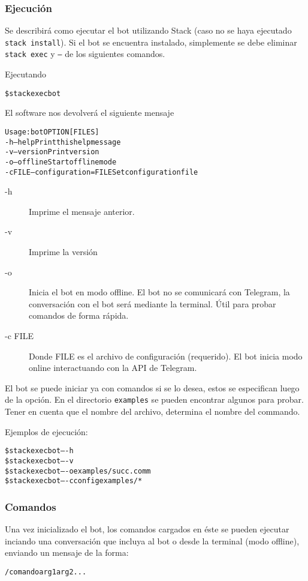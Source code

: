 \documentclass[12pt,a4paper,final]{article}
\begin{document}
\subsubsection{Ejecución}
Se describirá como ejecutar el bot utilizando Stack (caso no se haya ejecutado \texttt{stack install}). Si el bot se encuentra instalado, simplemente se debe eliminar \texttt{stack exec} y \texttt{--} de los siguientes comandos.

Ejecutando

\begin{alltt}
\$ stack exec bot
\end{alltt}

El software nos devolverá el siguiente mensaje
\begin{alltt}
Usage: bot OPTION [FILES]
  -h       --help                Print this help message
  -v       --version             Print version
  -o       --offline             Start offline mode
  -c FILE  --configuration=FILE  Set configuration file
\end{alltt}
\clearpage
\begin{description}
\item [-h] Imprime el mensaje anterior.
\item [-v] Imprime la versión
\item [-o] Inicia el bot en modo offline. El bot no se comunicará con Telegram, la conversación con el bot será mediante la terminal. Útil para probar comandos de forma rápida.
\item [-c FILE] Donde FILE es el archivo de configuración (requerido). El bot inicia modo online interactuando con la API de Telegram. 
\end{description}

El bot se puede iniciar ya con comandos si se lo desea, estos se especifican luego de la opción. En el directorio \texttt{examples} se pueden encontrar algunos para probar. Tener en cuenta que el nombre del archivo, determina el nombre del commando.

Ejemplos de ejecución:
\begin{alltt}
\$ stack exec bot -- -h
\$ stack exec bot -- -v
\$ stack exec bot -- -o examples/succ.comm
\$ stack exec bot -- -c config examples/*
\end{alltt}

\subsubsection{Comandos}
Una vez inicializado el bot, los comandos cargados en éste se pueden ejecutar inciando una conversación que incluya al bot o desde la terminal (modo offline), enviando un mensaje de la forma:
\begin{alltt}
/comando arg1 arg2 ...
\end{alltt}
\end{document}
